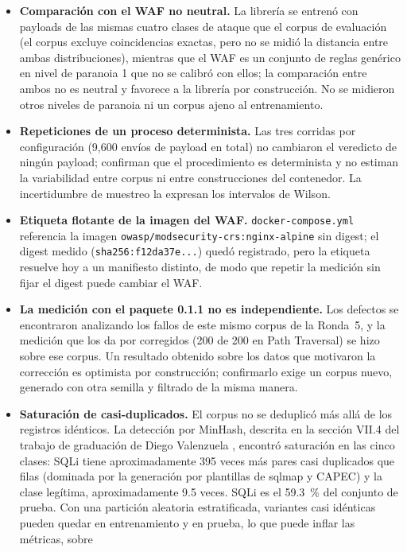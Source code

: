 \begin{itemize}
        \item \textbf{Comparación con el WAF no neutral.} La librería se entrenó con payloads de las
    mismas cuatro clases de ataque que el corpus de evaluación (el corpus excluye coincidencias
    exactas, pero no se midió la distancia entre ambas distribuciones), mientras que el WAF es un
    conjunto de reglas genérico en nivel de paranoia 1 que no se calibró con ellos; la comparación
    entre ambos no es neutral y favorece a la librería por construcción. No se midieron otros niveles de paranoia ni
    un corpus ajeno al entrenamiento.
    \item \textbf{Repeticiones de un proceso determinista.} Las tres corridas por configuración
    (9{,}600 envíos de payload en total) no cambiaron el veredicto de ningún payload; confirman que
    el procedimiento es determinista y no estiman la variabilidad entre corpus ni entre
    construcciones del contenedor. La incertidumbre de muestreo la expresan los intervalos de
    Wilson.
    \item \textbf{Etiqueta flotante de la imagen del WAF.} \texttt{docker-compose.yml} referencia la
    imagen \texttt{owasp/modsecurity-crs:nginx-alpine} sin digest; el digest medido
    (\texttt{sha256:f12da37e...}) quedó registrado, pero la etiqueta resuelve hoy a un manifiesto
    distinto, de modo que repetir la medición sin fijar el digest puede cambiar el WAF.
    \item \textbf{La medición con el paquete 0.1.1 no es independiente.} Los defectos se
    encontraron analizando los fallos de este mismo corpus de la Ronda~5, y la medición que los da
    por corregidos (200 de 200 en Path Traversal) se hizo sobre ese corpus. Un resultado obtenido
    sobre los datos que motivaron la corrección es optimista por construcción; confirmarlo exige un
    corpus nuevo, generado con otra semilla y filtrado de la misma manera.
    \item \textbf{Saturación de casi-duplicados.} El corpus no se deduplicó más allá de los
    registros idénticos. La detección por MinHash, descrita en la sección VII.4 del trabajo de
    graduación de Diego Valenzuela \cite{valenzuela2026ia}, encontró saturación en las cinco clases: SQLi tiene
    aproximadamente 395 veces más pares casi duplicados que filas (dominada por la generación por
    plantillas de sqlmap y CAPEC) y la clase legítima, aproximadamente 9.5 veces. SQLi es el
    59.3~\% del conjunto de prueba. Con una partición aleatoria estratificada, variantes casi
    idénticas pueden quedar en entrenamiento y en prueba, lo que puede inflar las métricas, sobre

\end{itemize}
